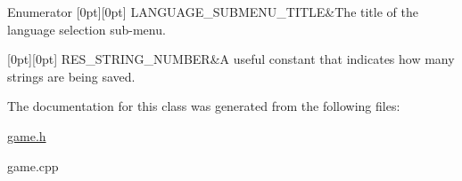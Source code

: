 \begin{DoxyEnumFields}{Enumerator}
[0pt][0pt]{}\mbox{\label{classgame_a750823afdadfbde9c945b9d0703c499da0da02304fc17f5e8de20c354600224cb}} 
L\+A\+N\+G\+U\+A\+G\+E\+\_\+\+S\+U\+B\+M\+E\+N\+U\+\_\+\+T\+I\+T\+LE&The title of the language selection sub-\/menu. \\
\hline

[0pt][0pt]{}\mbox{\label{classgame_a750823afdadfbde9c945b9d0703c499da9fc16aaae3b7622481465a27e7908aa6}} 
R\+E\+S\+\_\+\+S\+T\+R\+I\+N\+G\+\_\+\+N\+U\+M\+B\+ER&A useful constant that indicates how many strings are being saved. \\
\hline

\end{DoxyEnumFields}


The documentation for this class was generated from the following files\+:\begin{DoxyCompactItemize}
\item 
\mbox{\hyperlink{game_8h}{game.\+h}}\item 
game.\+cpp\end{DoxyCompactItemize}
